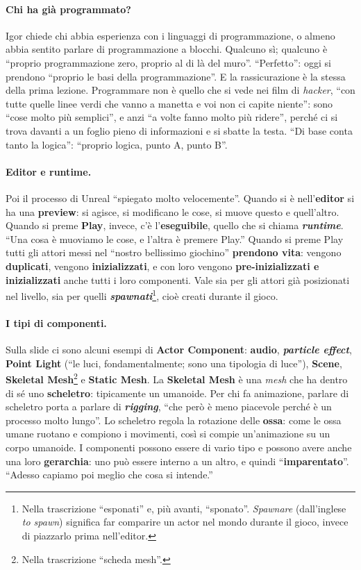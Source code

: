 \paragraph{Chi ha già programmato?} Igor chiede chi abbia esperienza con i linguaggi di
programmazione, o almeno abbia sentito parlare di programmazione a blocchi. Qualcuno sì;
qualcuno è ``proprio programmazione zero, proprio al di là del muro''. ``Perfetto'':
oggi si prendono ``proprio le basi della programmazione''. E la rassicurazione è la
stessa della prima lezione. Programmare non è quello che si vede nei film di
\emph{hacker}, ``con tutte quelle linee verdi che vanno a manetta e voi non ci capite
niente'': sono ``cose molto più semplici'', e anzi ``a volte fanno molto più ridere'',
perché ci si trova davanti a un foglio pieno di informazioni e si sbatte la testa.
``Di base conta tanto la logica'': ``proprio logica, punto A, punto B''.

\paragraph{Editor e runtime.} Poi il processo di Unreal ``spiegato molto velocemente''.
Quando si è nell'\textbf{editor} si ha una \textbf{preview}: si agisce, si modificano le
cose, si muove questo e quell'altro. Quando si preme \textbf{Play}, invece, c'è
l'\textbf{eseguibile}, quello che si chiama \textbf{\emph{runtime}}. ``Una cosa è
muoviamo le cose, e l'altra è premere Play.'' Quando si preme Play tutti gli attori
messi nel ``nostro bellissimo giochino'' \textbf{prendono vita}: vengono
\textbf{duplicati}, vengono \textbf{inizializzati}, e con loro vengono
\textbf{pre-inizializzati e inizializzati} anche tutti i loro componenti. Vale sia per gli
attori già posizionati nel livello, sia per quelli
\textbf{\emph{spawnati}}\footnote{Nella trascrizione ``esponati'' e, più avanti,
``sponato''. \emph{Spawnare} (dall'inglese \emph{to spawn}) significa far comparire un
actor nel mondo durante il gioco, invece di piazzarlo prima nell'editor.}, cioè creati
durante il gioco.

\paragraph{I tipi di componenti.} Sulla slide ci sono alcuni esempi di \textbf{Actor
Component}: \textbf{audio}, \textbf{\emph{particle effect}}, \textbf{Point Light} (``le
luci, fondamentalmente; sono una tipologia di luce''), \textbf{Scene},
\textbf{Skeletal Mesh}\footnote{Nella trascrizione ``scheda mesh''.} e \textbf{Static
Mesh}. La \textbf{Skeletal Mesh} è una \emph{mesh} che ha dentro di sé uno
\textbf{scheletro}: tipicamente un umanoide. Per chi fa animazione, parlare di scheletro
porta a parlare di \textbf{\emph{rigging}}, ``che però è meno piacevole perché è un
processo molto lungo''. Lo scheletro regola la rotazione delle \textbf{ossa}: come le
ossa umane ruotano e compiono i movimenti, così si compie un'animazione su un corpo
umanoide. I componenti possono essere di vario tipo e possono avere anche una loro
\textbf{gerarchia}: uno può essere interno a un altro, e quindi
``\textbf{imparentato}''. ``Adesso capiamo poi meglio che cosa si intende.''

